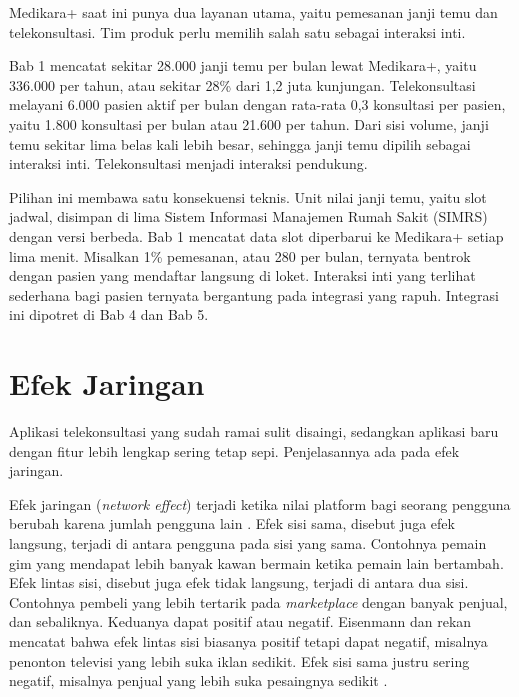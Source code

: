 \begin{kasus}[title={Kasus Medikara Health: Memilih Interaksi Inti Medikara+}]
Medikara+ saat ini punya dua layanan utama, yaitu pemesanan janji temu dan
telekonsultasi. Tim produk perlu memilih salah satu sebagai interaksi inti.

Bab 1 mencatat sekitar 28.000 janji temu per bulan lewat Medikara+, yaitu 336.000
per tahun, atau sekitar 28\% dari 1,2 juta kunjungan. Telekonsultasi melayani 6.000
pasien aktif per bulan dengan rata-rata 0,3 konsultasi per pasien, yaitu 1.800
konsultasi per bulan atau 21.600 per tahun. Dari sisi volume, janji temu sekitar
lima belas kali lebih besar, sehingga janji temu dipilih sebagai interaksi inti.
Telekonsultasi menjadi interaksi pendukung.

Pilihan ini membawa satu konsekuensi teknis. Unit nilai janji temu, yaitu slot
jadwal, disimpan di lima Sistem Informasi Manajemen Rumah Sakit (SIMRS) dengan
versi berbeda. Bab 1 mencatat data slot diperbarui ke Medikara+ setiap lima menit.
Misalkan 1\% pemesanan, atau 280 per bulan, ternyata bentrok dengan pasien yang
mendaftar langsung di loket. Interaksi inti yang terlihat sederhana bagi pasien ternyata bergantung
pada integrasi yang rapuh. Integrasi ini dipotret di Bab 4 dan Bab 5.
\end{kasus}

\section{Efek Jaringan}

Aplikasi telekonsultasi yang sudah ramai sulit disaingi, sedangkan aplikasi
baru dengan fitur lebih lengkap sering tetap sepi. Penjelasannya ada pada efek
jaringan.

Efek jaringan (\textit{network effect}) terjadi ketika nilai platform bagi
seorang pengguna berubah karena jumlah pengguna lain
\cite{parker2016platform}. Efek sisi sama, disebut juga efek langsung, terjadi
di antara pengguna pada sisi yang sama. Contohnya pemain gim yang mendapat
lebih banyak kawan bermain ketika pemain lain bertambah. Efek lintas sisi,
disebut juga efek tidak langsung, terjadi di antara dua sisi. Contohnya pembeli
yang lebih tertarik pada \textit{marketplace} dengan banyak penjual, dan
sebaliknya. Keduanya dapat positif atau negatif. Eisenmann dan rekan mencatat
bahwa efek lintas sisi biasanya positif tetapi dapat negatif, misalnya penonton
televisi yang lebih suka iklan sedikit. Efek sisi sama justru sering negatif,
misalnya penjual yang lebih suka pesaingnya sedikit
\cite{eisenmann2006strategies}.

